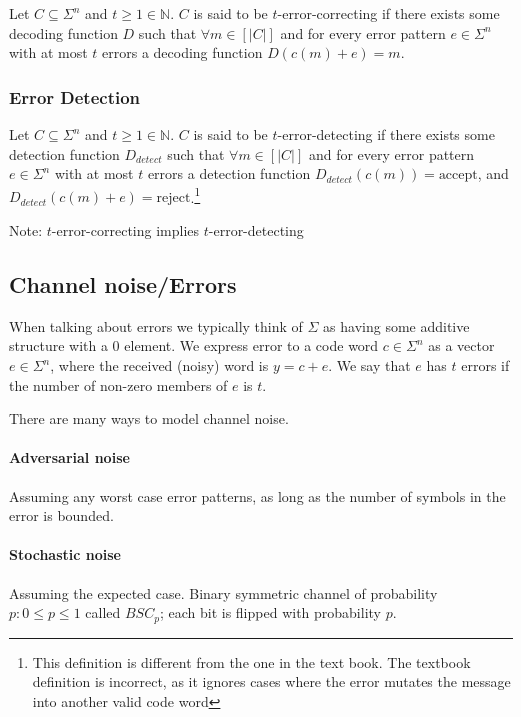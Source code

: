 \documentclass{idc_msc}
\begin{document}
Let $C \subseteq \Sigma^n$ and $t \ge 1 \in \mathbb{N}$. $C$ is said to be $t$-error-correcting if there exists some decoding function $D$ such that $\forall m \in [|C|]$ and for every error pattern $e \in \Sigma^n$ with at most $t$ errors a decoding function $D(c(m) + e) = m$.

\subsubsection{Error Detection}

Let $C \subseteq \Sigma^n$ and $t \ge 1 \in \mathbb{N}$. $C$ is said to be $t$-error-detecting if there exists some detection function $D_{detect}$ such that $\forall m \in [|C|]$ and for every error pattern $e \in \Sigma^n$ with at most $t$ errors a detection function $D_{detect}(c(m)) = \text{accept}$, and $D_{detect}(c(m) + e) = \text{reject}$.\footnote{This definition is different from the one in the text book. The textbook definition is incorrect, as it ignores cases where the error mutates the message into another valid code word}

Note: $t$-error-correcting implies $t$-error-detecting

\subsection{Channel noise/Errors}

When talking about errors we typically think of $\Sigma$ as having some additive structure with a $0$ element.
We express error to a code word $c \in \Sigma^n$ as a vector $e \in \Sigma^n$, where the received (noisy) word is $y = c + e$.
We say that $e$ has $t$ errors if the number of non-zero members of $e$ is $t$.

There are many ways to model channel noise.

\paragraph{Adversarial noise}

Assuming any worst case error patterns, as long as the number of symbols in the error is bounded.

\paragraph{Stochastic noise}

Assuming the expected case. Binary symmetric channel of probability $p : 0 \le p \le 1$ called $BSC_p$; each bit is flipped with probability $p$.
\end{document}
